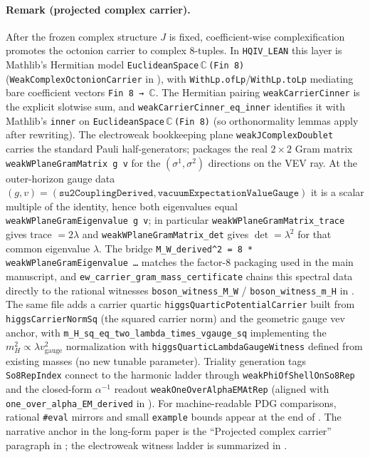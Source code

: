 \documentclass[11pt]{article}
\begin{document}
\paragraph{Remark (projected complex carrier).}
\begin{sloppypar}
After the frozen complex structure $J$ is fixed, coefficient-wise complexification promotes the octonion carrier to complex $8$-tuples.
In \texttt{HQIV\_LEAN} this layer is Mathlib's Hermitian model \texttt{EuclideanSpace}\,$\mathbb{C}$\,\texttt{(Fin\,8)} (\texttt{WeakComplexOctonionCarrier} in ), with \texttt{WithLp.ofLp}/\texttt{WithLp.toLp} mediating bare coefficient vectors \texttt{Fin\,8\,→\,}$\mathbb{C}$.
The Hermitian pairing \texttt{weakCarrierCinner} is the explicit slotwise sum, and \texttt{weakCarrierCinner\_eq\_inner} identifies it with Mathlib's \texttt{inner} on \texttt{EuclideanSpace}\,$\mathbb{C}$\,\texttt{(Fin\,8)} (so orthonormality lemmas apply after rewriting).
The electroweak bookkeeping plane \texttt{weakJComplexDoublet} carries the standard Pauli half-generators;  packages the real $2\times2$ Gram matrix \texttt{weakWPlaneGramMatrix\,g\,v} for the $(\sigma^1,\sigma^2)$ directions on the VEV ray.
At the outer-horizon gauge data $(g,v)=(\texttt{su2CouplingDerived},\texttt{vacuumExpectationValueGauge})$ it is a scalar multiple of the identity, hence both eigenvalues equal \texttt{weakWPlaneGramEigenvalue\,g\,v}; in particular \texttt{weakWPlaneGramMatrix\_trace} gives trace $=2\lambda$ and \texttt{weakWPlaneGramMatrix\_det} gives $\det=\lambda^2$ for that common eigenvalue $\lambda$.
The bridge \texttt{M\_W\_derived\^{}2\,=\,8\,*\,weakWPlaneGramEigenvalue\,…} matches the factor-$8$ packaging used in the main manuscript, and \texttt{ew\_carrier\_gram\_mass\_certificate} chains this spectral data directly to the rational witnesses \texttt{boson\_witness\_M\_W} / \texttt{boson\_witness\_m\_H} in .
The same file adds a carrier quartic \texttt{higgsQuarticPotentialCarrier} built from \texttt{higgsCarrierNormSq} (the squared carrier norm) and the geometric gauge vev anchor, with \texttt{m\_H\_sq\_eq\_two\_lambda\_times\_vgauge\_sq} implementing the $m_H^2\propto \lambda v_{\mathrm{gauge}}^2$ normalization with \texttt{higgsQuarticLambdaGaugeWitness} defined from existing masses (no new tunable parameter).
Triality generation tags \texttt{So8RepIndex} connect to the harmonic ladder through \texttt{weakPhiOfShellOnSo8Rep} and the closed-form $\alpha^{-1}$ readout \texttt{weakOneOverAlphaEMAtRep} (aligned with \texttt{one\_over\_alpha\_EM\_derived} in ).
For machine-readable PDG comparisons, rational \texttt{\#eval} mirrors and small \texttt{example} bounds appear at the end of .
The narrative anchor in the long-form paper is the ``Projected complex carrier'' paragraph in ; the electroweak witness ladder is summarized in .
\end{sloppypar}
\end{document}

